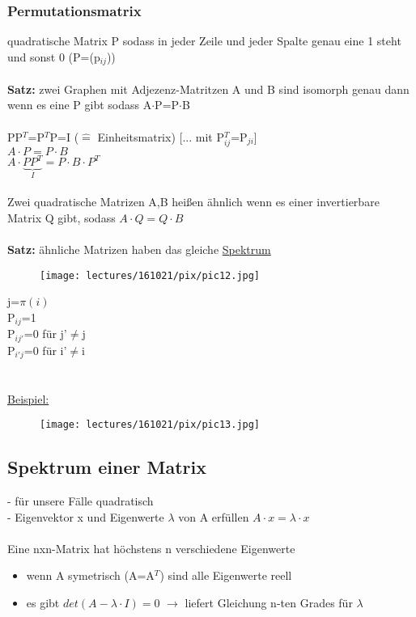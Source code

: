 \subsubsection{Permutationsmatrix}
quadratische Matrix P sodass in jeder Zeile und jeder Spalte genau eine 1 steht und sonst 0 (P=(p$_{ij}$))
\\\\
\textbf{Satz:} zwei Graphen mit Adjezenz-Matritzen A und B sind isomorph genau dann wenn es eine P gibt sodass A$\cdot$P=P$\cdot$B
\\\\
PP$^T$=P$^T$P=I ($\widehat{=}$ Einheitsmatrix) [... mit P$^T_{ij}$=P$_{ji}$]\\
$A \cdot P = P \cdot B$\\
$A \cdot \underbrace{PP^T}_{I}=P \cdot B \cdot P^T$
\\\\
Zwei quadratische Matrizen A,B heißen ähnlich wenn es einer invertierbare Matrix Q gibt, sodass $A \cdot Q = Q \cdot B$
\\\\
\textbf{Satz:} ähnliche Matrizen haben das gleiche \underline{Spektrum}
\begin{figure}[htp]
\centering
\texttt{[image: lectures/161021/pix/pic12.jpg]}
\end{figure}

j=$\pi(i)$\\
P$_{ij}$=1\\
P$_{ij'}$=0 für j'$\neq$j\\
P$_{i'j}$=0 für i'$\neq$i\\
\\\\
\underline{Beispiel:}
\begin{figure}[htp]
\centering
\texttt{[image: lectures/161021/pix/pic13.jpg]}
\end{figure}

\newpage
\subsection{Spektrum einer Matrix}
- für unsere Fälle quadratisch\\
- Eigenvektor x und Eigenwerte $\lambda$ von A erfüllen $A \cdot x = \lambda \cdot x$
\\\\
Eine nxn-Matrix hat höchstens n verschiedene Eigenwerte
\begin{itemize}
	\item wenn A symetrisch (A=A$^T$) sind alle Eigenwerte reell
	\item es gibt $det(A-\lambda \cdot I)=0$ $\rightarrow$ liefert Gleichung n-ten Grades für $\lambda$
\end{itemize}


